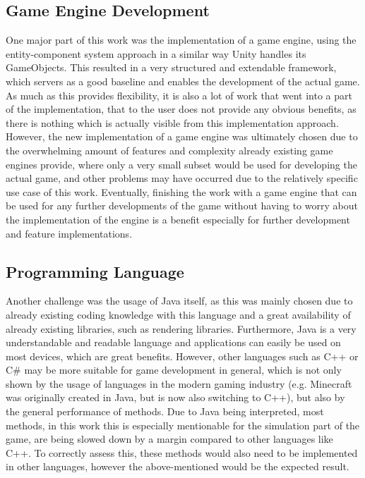 \subsection{Game Engine Development}\label{subsec:entity-component-system-challenges}
One major part of this work was the implementation of a game engine, using the entity-component system approach in a similar way
Unity handles its GameObjects.
This resulted in a very structured and extendable framework, which servers as a good baseline and enables the development of the actual game.
As much as this provides flexibility, it is also a lot of work that went into a part of the implementation, that to the user
does not provide any obvious benefits, as there is nothing which is actually visible from this implementation approach.
However, the new implementation of a game engine was ultimately chosen due to the overwhelming amount of features and complexity
already existing game engines provide, where only a very small subset would be used for developing the actual game, and other problems
may have occurred due to the relatively specific use case of this work.
Eventually, finishing the work with a game engine that can be used for any further developments of the game without having to worry
about the implementation of the engine is a benefit especially for further development and feature implementations.

\subsection{Programming Language}\label{subsec:programming-language}
Another challenge was the usage of Java itself, as this was mainly chosen due to already existing coding knowledge with this
language and a great availability of already existing libraries, such as rendering libraries.
Furthermore, Java is a very understandable and readable language and applications can easily be used on most devices, which are great benefits.
However, other languages such as C++ or C\# may be more suitable for game development in general, which is not only shown by
the usage of languages in the modern gaming industry (e.g. Minecraft was originally created in Java, but is now also switching to C++), but
also by the general performance of methods.
Due to Java being interpreted, most methods, in this work this is especially mentionable for the simulation part of the game, are being slowed down
by a margin compared to other languages like C++.
To correctly assess this, these methods would also need to be implemented in other languages, however the above-mentioned would
be the expected result.
